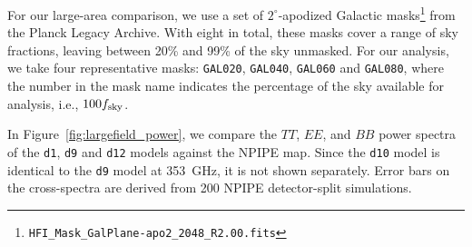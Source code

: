 \documentclass[twocolumn]{aastex631}
\begin{document}
For our large-area comparison, we use a set of $2^\circ$-apodized Galactic masks\footnote{\texttt{HFI\_Mask\_GalPlane-apo2\_2048\_R2.00.fits}} from the Planck Legacy Archive. With eight in total, these masks cover a range of sky fractions, leaving between 20\% and 99\% of the sky unmasked. For our analysis, we take four representative masks: \texttt{GAL020}, \texttt{GAL040}, \texttt{GAL060} and \texttt{GAL080}, where the number in the mask name indicates the percentage of the sky available for analysis, i.e., $100 f_{\rm sky}$.

In Figure~\ref{fig:largefield_power}, we compare the $TT$, $EE$, and $BB$ power spectra of the \texttt{d1}, \texttt{d9} and \texttt{d12} models against the NPIPE map. Since the \texttt{d10} model is identical to the \texttt{d9} model at 353~GHz, it is not shown separately. Error bars on the cross-spectra are derived from 200 NPIPE detector-split simulations.
\end{document}
